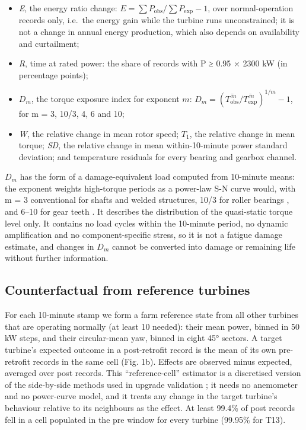 \documentclass[preprint,12pt]{elsarticle}
\begin{document}
\begin{itemize}
\item
  \emph{E}, the energy ratio change: \(E = \sum P_\mathrm{obs} / \sum P_\mathrm{exp} - 1\), over normal-operation records only, i.e.~the energy gain while the turbine runs unconstrained; it is not a change in annual energy production, which also depends on availability and curtailment;
\item
  \emph{R}, time at rated power: the share of records with P ≥ 0.95 × 2300 kW (in percentage points);
\item
  \(D_{m}\), the torque exposure index for exponent \(m\): \(D_{m} = \left( \overline{T_\mathrm{obs}^{\,m}} \big/ \overline{T_\mathrm{exp}^{\,m}} \right)^{1/m} - 1\), for m = 3, 10/3, 4, 6 and 10;
\item
  \emph{W}, the relative change in mean rotor speed; \(T_1\), the relative change in mean torque; \emph{SD}, the relative change in mean within-10-minute power standard deviation; and temperature residuals for every bearing and gearbox channel.
\end{itemize}

\(D_{m}\) has the form of a damage-equivalent load \cite{burton11} computed from 10-minute means: the exponent weights high-torque periods as a power-law S-N curve would, with m = 3 conventional for shafts and welded structures, 10/3 for roller bearings \cite{iso281}, and 6--10 for gear teeth \cite{nejad14}. It describes the distribution of the quasi-static torque level only. It contains no load cycles within the 10-minute period, no dynamic amplification and no component-specific stress, so it is not a fatigue damage estimate, and changes in \(D_{m}\) cannot be converted into damage or remaining life without further information.

\subsection{Counterfactual from reference turbines}

For each 10-minute stamp we form a farm reference state from all other turbines that are operating normally (at least 10 needed): their mean power, binned in 50 kW steps, and their circular-mean yaw, binned in eight 45° sectors. A target turbine's expected outcome in a post-retrofit record is the mean of its own pre-retrofit records in the same cell (Fig. 1b). Effects are observed minus expected, averaged over post records. This ``reference-cell'' estimator is a discretised version of the side-by-side methods used in upgrade validation \cite{astolfi18,clerc}; it needs no anemometer and no power-curve model, and it treats any change in the target turbine's behaviour relative to its neighbours as the effect. At least 99.4\% of post records fell in a cell populated in the pre window for every turbine (99.95\% for T13).
\end{document}
